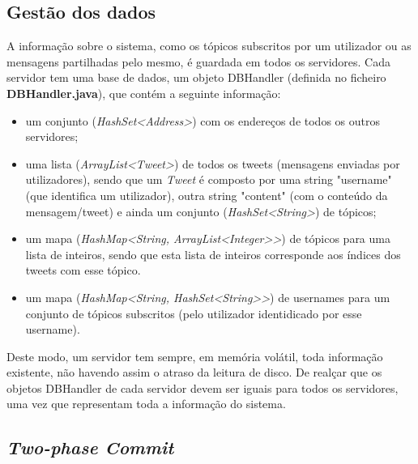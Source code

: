 \documentclass[a4paper]{report}
\begin{document}
		\subsection{Gestão dos dados}

		A informação sobre o sistema, como os tópicos subscritos por um utilizador ou as mensagens partilhadas pelo mesmo, é guardada em todos os servidores.
		Cada servidor tem uma base de dados, um objeto DBHandler (definida no ficheiro \textbf{DBHandler.java}), que contém a seguinte informação:
		\begin{itemize}
			\item um conjunto (\textit{HashSet<Address>}) com os endereços de todos os outros servidores;
			\item uma lista (\textit{ArrayList<Tweet>}) de todos os tweets (mensagens enviadas por utilizadores), 
			sendo que um \textit{Tweet} é composto por uma string "username" (que identifica um utilizador), outra string "content" (com o conteúdo da mensagem/tweet)
			e ainda um conjunto (\textit{HashSet<String>}) de tópicos;
			\item um mapa (\textit{HashMap<String, ArrayList<Integer>>}) de tópicos para uma lista de inteiros, sendo que esta lista de inteiros corresponde aos índices dos tweets com esse tópico.
			\item um mapa (\textit{HashMap<String, HashSet<String>>}) de usernames para um conjunto de tópicos subscritos (pelo utilizador identidicado por esse username).
		\end{itemize}
		
		Deste modo, um servidor tem sempre, em memória volátil, toda informação existente, não havendo assim o atraso da leitura de disco.
		De realçar que os objetos DBHandler de cada servidor devem ser iguais para todos os servidores, uma vez que representam toda a informação do sistema.


		\subsection{\textit{Two-phase Commit}}
\end{document}

